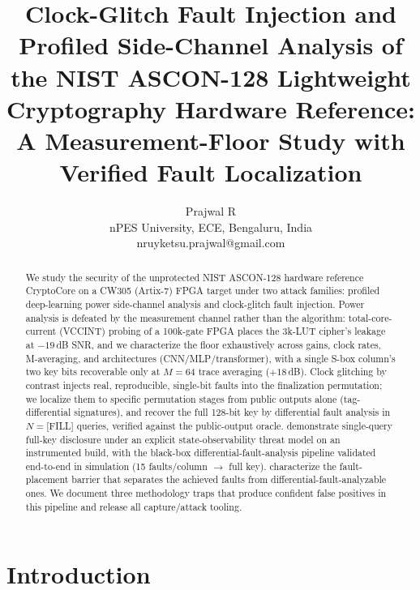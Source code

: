 \documentclass[a4paper,11pt,twocolumn]{article}
\title{Clock-Glitch Fault Injection and Profiled Side-Channel Analysis of
the NIST ASCON-128 Lightweight Cryptography Hardware Reference:
A Measurement-Floor Study with Verified Fault Localization}
\author{Prajwal R\\nPES University, ECE, Bengaluru, India\\nruyketsu.prajwal@gmail.com}}
\newif\blackbox
\newif\demoonly
\newif\negativeonly
\begin{document}
\maketitle

\begin{abstract}
We study the security of the unprotected NIST ASCON-128 hardware reference
CryptoCore on a CW305 (Artix-7) FPGA target under two attack families:
profiled deep-learning power side-channel analysis and clock-glitch fault
injection. Power analysis is defeated by the measurement channel rather
than the algorithm: total-core-current (VCCINT) probing of a 100k-gate FPGA
places the 3k-LUT cipher's leakage at $-19$\,dB SNR, and we characterize
the floor exhaustively across gains, clock rates, M-averaging, and
architectures (CNN/MLP/transformer), with a single S-box column's two key
bits recoverable only at $M{=}64$ trace averaging ($+18$\,dB). Clock
glitching by contrast injects real, reproducible, single-bit faults into
the finalization permutation; we localize them to specific permutation
stages from public outputs alone (tag-differential signatures), and
\ifblackbox recover the full 128-bit key by differential fault analysis
in $N{=}$[FILL] queries, verified against the public-output oracle.
\fi
\ifdemoonly
demonstrate single-query full-key disclosure under an explicit
state-observability threat model on an instrumented build, with the
black-box differential-fault-analysis pipeline validated end-to-end in
simulation (15 faults/column $\rightarrow$ full key).
\fi
\ifnegativeonly
characterize the fault-placement barrier that separates the achieved
faults from differential-fault-analyzable ones.
\fi
We document three methodology traps that produce confident false
positives in this pipeline and release all capture/attack tooling.
\end{abstract}

\section{Introduction}
\end{document}
